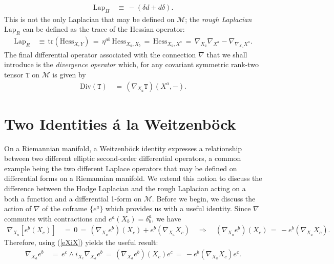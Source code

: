 \documentclass[10pt,a4paper]{article}
\newcommand{\M}{\mathcal{M}}
\newcommand\w{\wedge}
\newcommand\qLRA{\quad\Longrightarrow\quad}
\newcommand{\LapH}{\text{Lap}_{H}}
\newcommand{\LapR}{\text{Lap}_{R}}
\newcommand{\Div}{\text{Div}}
\newcommand{\Hess}{\text{Hess}}
\begin{document}
\begin{align}\label{LapH}
	\LapH &\,\equiv\, -(\delta d + d\delta).
\end{align}
This is not the only Laplacian that may be defined on $\M$; the {\it rough Laplacian} $\LapR$ can be defined as the trace of the Hessian operator:
\begin{align}\label{LapR}
	\LapR &\,\equiv\, \text{tr}(\Hess_{X,Y}) \,=\, \eta^{ab}\,\Hess_{X_{a},X_{b}} \,=\, \Hess_{X_{a},X^{a}} \,=\, \nabla_{X_{a}}\nabla_{X^{a}} - \nabla_{\nabla_{X_{a}}X^{a}}.
\end{align}
The final differential operator associated with the connection $\nabla$ that we shall introduce is the {\it divergence operator} which, for any covariant symmetric rank-two tensor $\texttt{T}$ on $\M$ is given by
\begin{align}\label{DIV}
	\Div(\texttt{T}) &\,=\, (\nabla_{X_{a}}\texttt{T})(X^{a},-).
\end{align} 


\section{Two Identities \'{a} la Weitzenb\"{o}ck}
On a Riemannian manifold, a Weitzenb\"{o}ck identity expresses a relationship between two different elliptic second-order differential operators, a common example being the two different Laplace operators that may be defined on differential forms on a Riemannian manifold. We extend this notion to discuss the difference between the Hodge Laplacian and the rough Laplacian acting on a both a function and a differential 1-form on $\M$. Before we begin, we discuss the action of $\nabla$ of the coframe $\{e^{a}\}$ which provides us with a useful identity. Since $\nabla$ commutes with contractions and $e^{a}(X_{b})=\delta^{a}_{b}$, we have
\begin{align*}
	\nabla_{X_{a}}\left[ e^{b}(X_{c}) \right] &\,=\, 0 \,=\, (\nabla_{X_{a}}e^{b})(X_{c}) + e^{b}(\nabla_{X_{a}}X_{c}) \qLRA
	(\nabla_{X_{a}}e^{b})(X_{c}) \,=\, - e^{b}(\nabla_{X_{a}}X_{c}).
\end{align*}
Therefore, using (\ref{eXiX}) yields the useful result:
\begin{align}\label{LapFunc}
	\nabla_{X_{a}}e^{b} &\,=\, e^{c}\w i_{X_{c}}\nabla_{X_{a}}e^{b} \,=\, (\nabla_{X_{a}}e^{b})(X_{c})e^{c} \,=\, - e^{b}(\nabla_{X_{a}}X_{c})e^{c}.
\end{align}
\end{document}
